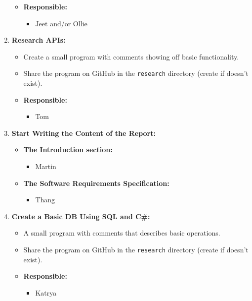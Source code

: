 \documentclass[11pt]{article}
\begin{document}
\begin{enumerate}
  \begin{itemize}
  \tightlist
  \item
    \textbf{Responsible:}

    \begin{itemize}
    \tightlist
    \item
      Jeet and/or Ollie
    \end{itemize}
  \end{itemize}
\item
  \textbf{Research APIs:}

  \begin{itemize}
  \tightlist
  \item
    Create a small program with comments showing off basic
    functionality.
  \item
    Share the program on GitHub in the \texttt{research} directory
    (create if doesn't exist).
  \item
    \textbf{Responsible:}

    \begin{itemize}
    \tightlist
    \item
      Tom
    \end{itemize}
  \end{itemize}
\item
  \textbf{Start Writing the Content of the Report:}

  \begin{itemize}
  \tightlist
  \item
    \textbf{The Introduction section:}

    \begin{itemize}
    \tightlist
    \item
      Martin
    \end{itemize}
  \item
    \textbf{The Software Requirements Specification:}

    \begin{itemize}
    \tightlist
    \item
      Thang
    \end{itemize}
  \end{itemize}
\item
  \textbf{Create a Basic DB Using SQL and C\#:}

  \begin{itemize}
  \tightlist
  \item
    A small program with comments that describes basic operations.
  \item
    Share the program on GitHub in the \texttt{research} directory
    (create if doesn't exist).
  \item
    \textbf{Responsible:}

    \begin{itemize}
    \tightlist
    \item
      Katrya
    \end{itemize}
  \end{itemize}
\end{enumerate}
\end{document}
